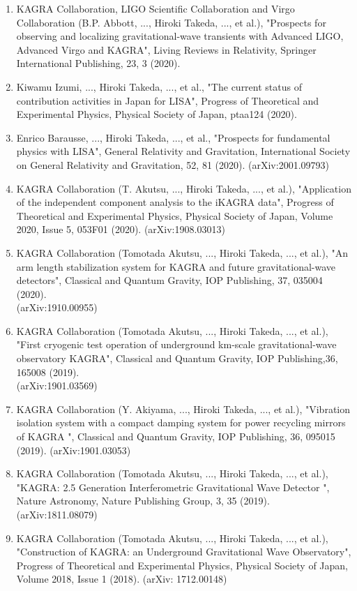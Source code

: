 \documentclass[uplatex, 12pt,a4paper]{jsarticle}
\begin{document}
\begin{enumerate}
\item KAGRA Collaboration, LIGO Scientific Collaboration and Virgo Collaboration (B.P. Abbott, ..., Hiroki Takeda, ..., et al.), "Prospects for observing and localizing gravitational-wave transients with Advanced LIGO, Advanced Virgo and KAGRA", Living Reviews in Relativity, Springer International Publishing, 23, 3 (2020).

\item Kiwamu Izumi, ..., Hiroki Takeda, ..., et al., "The current status of contribution activities in Japan for LISA", Progress of Theoretical and Experimental Physics, Physical Society of Japan, ptaa124 (2020).

\item Enrico Barausse, ..., Hiroki Takeda, ..., et al., "Prospects for fundamental physics with LISA", General Relativity and Gravitation, International Society on General Relativity and Gravitation, 52, 81 (2020). (arXiv:2001.09793)

\item KAGRA Collaboration (T. Akutsu, ..., Hiroki Takeda, ..., et al.), "Application of the independent component analysis to the iKAGRA data", Progress of Theoretical and Experimental Physics, Physical Society of Japan, Volume 2020, Issue 5, 053F01 (2020). (arXiv:1908.03013)

\item KAGRA Collaboration (Tomotada Akutsu, ..., Hiroki Takeda, ..., et al.), "An arm length stabilization system for KAGRA and future gravitational-wave detectors", Classical and Quantum Gravity, IOP Publishing, 37, 035004 (2020).\\ (arXiv:1910.00955)

\item KAGRA Collaboration (Tomotada Akutsu, ..., Hiroki Takeda, ..., et al.), "First cryogenic test operation of underground km-scale gravitational-wave observatory KAGRA", Classical and Quantum Gravity, IOP Publishing,36, 165008 (2019).\\ (arXiv:1901.03569)

\item KAGRA Collaboration (Y. Akiyama, ..., Hiroki Takeda, ..., et al.), "Vibration isolation system with a compact damping system for power recycling mirrors of KAGRA ", Classical and Quantum Gravity, IOP Publishing, 36, 095015 (2019). (arXiv:1901.03053)

\item KAGRA Collaboration (Tomotada Akutsu, ..., Hiroki Takeda, ..., et al.), "KAGRA: 2.5 Generation Interferometric Gravitational Wave Detector ", Nature Astronomy, Nature Publishing Group, 3, 35 (2019). (arXiv:1811.08079)

\item KAGRA Collaboration (Tomotada Akutsu, ..., Hiroki Takeda, ..., et al.), "Construction of KAGRA: an Underground Gravitational Wave Observatory", Progress of Theoretical and Experimental Physics, Physical Society of Japan, Volume 2018, Issue 1 (2018). (arXiv: 1712.00148)

\end{enumerate}
\end{document}
